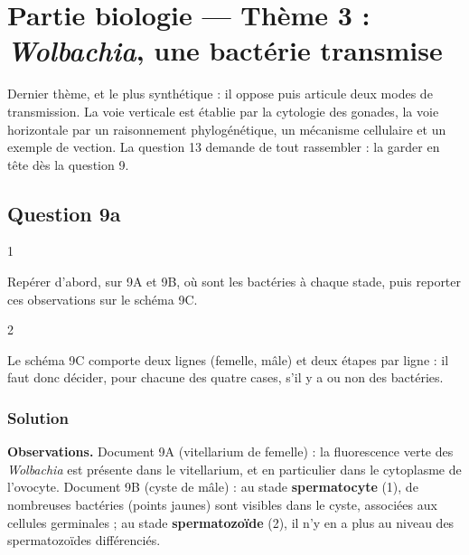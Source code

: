 \documentclass[11pt,a4paper]{article}
\begin{document}
\hypertarget{partie-biologie-thuxe8me-3-wolbachia-une-bactuxe9rie-transmise}{%
\section{\texorpdfstring{Partie biologie --- Thème 3 : \emph{Wolbachia}, une bactérie transmise}{Partie biologie --- Thème 3 : Wolbachia, une bactérie transmise}}\label{partie-biologie-thuxe8me-3-wolbachia-une-bactuxe9rie-transmise}}

Dernier thème, et le plus synthétique : il oppose puis articule deux modes de transmission. La voie verticale est établie par la cytologie des gonades, la voie horizontale par un raisonnement phylogénétique, un mécanisme cellulaire et un exemple de vection. La question 13 demande de tout rassembler : la garder en tête dès la question 9.

\hypertarget{question-9a}{%
\subsection{Question 9a}\label{question-9a}}

\begin{indication}{1}

Repérer d'abord, sur 9A et 9B, où sont les bactéries à chaque stade, puis reporter ces observations sur le schéma 9C.

\end{indication}

\begin{indication}{2}

Le schéma 9C comporte deux lignes (femelle, mâle) et deux étapes par ligne : il faut donc décider, pour chacune des quatre cases, s'il y a ou non des bactéries.

\end{indication}

\hypertarget{solution-61}{%
\subsubsection{Solution}\label{solution-61}}

\textbf{Observations.} Document 9A (vitellarium de femelle) : la fluorescence verte des \emph{Wolbachia} est présente dans le vitellarium, et en particulier dans le cytoplasme de l'ovocyte. Document 9B (cyste de mâle) : au stade \textbf{spermatocyte} (1), de nombreuses bactéries (points jaunes) sont visibles dans le cyste, associées aux cellules germinales ; au stade \textbf{spermatozoïde} (2), il n'y en a plus au niveau des spermatozoïdes différenciés.
\end{document}
